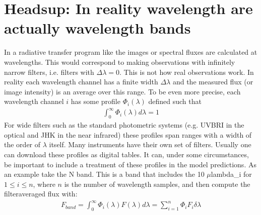 \documentclass[letterpaper,10pt,english]{sphinxmanual}
\begin{document}
\begin{sphinxVerbatim}[commandchars=\\\{\}]
               
\end{sphinxVerbatim}


\section{Heads\sphinxhyphen{}up: In reality wavelength are actually wavelength bands}
\label{\detokenize{imagesspectra:heads-up-in-reality-wavelength-are-actually-wavelength-bands}}\label{\detokenize{imagesspectra:sec-wavelength-bands}}
In a radiative transfer program like  the images or
spectral fluxes are calculated at  wavelengths. This would
correspond to making observations with infinitely narrow filters, i.e.
filters with \(\Delta\lambda=0\). This is not how real observations work.
In reality each wavelength channel has a finite width \(\Delta\lambda\) and
the measured flux (or image intensity) is an average over this range. To
be even more precise, each wavelength channel \(i\) has some profile
\(\Phi_i(\lambda)\) defined such that
\begin{equation*}
\begin{split}\int_0^{\infty}\Phi_i(\lambda)d\lambda=1\end{split}
\end{equation*}
For wide filters such as the standard photometric systems (e.g. UVBRI in
the optical and JHK in the near infrared) these profiles span ranges with a
width of the order of \(\lambda\) itself. Many instruments have their own
set of filters. Usually one can download these profiles as digital tables.
It can, under some circumstances, be important to include a treatment of
these profiles in the model predictions. As an example take the N band. This
is a band that includes the 10 \(\mu\)lambda\_i\textasciigrave{} for \(1\le i\le n\), where \(n\) is the number of
wavelength samples, and then compute the filter\sphinxhyphen{}averaged flux with:
\begin{equation*}
\begin{split}F_{band} = \int_0^{\infty}\Phi_i(\lambda)F(\lambda)d\lambda
= \sum_{i=1}^{n} \Phi_i F_i \delta\lambda\end{split}
\end{equation*}
\end{document}
